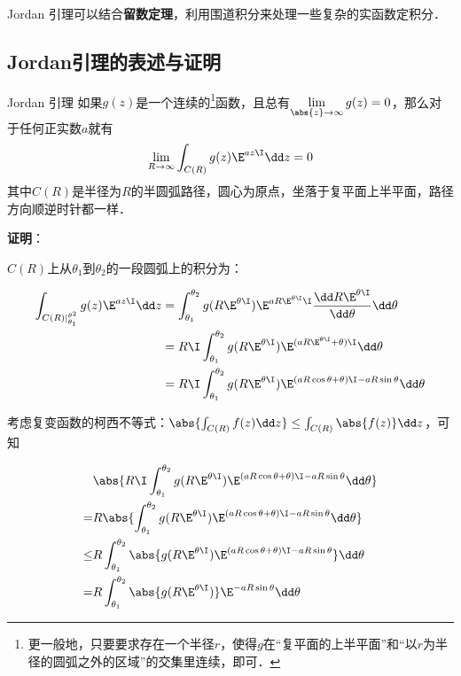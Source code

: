 



Jordan 引理可以结合\textbf{留数定理}，利用围道积分来处理一些复杂的实函数定积分．

\subsection{Jordan引理的表述与证明}

\begin{theorem}{Jordan 引理}
如果$g(z)$是一个连续的\footnote{更一般地，只要要求存在一个半径$r$，使得$g$在“复平面的上半平面”和“以$r$为半径的圆弧之外的区域”的交集里连续，即可．}函数，且总有$\lim\limits_{\abs{z}\to\infty}g(z)=0$，那么对于任何正实数$a$就有
\begin{equation}
\lim\limits_{R\to \infty}\int_{C(R)}g(z)\E^{az\I}\dd z=0
\end{equation}
其中$C(R)$是半径为$R$的半圆弧路径，圆心为原点，坐落于复平面上半平面，路径方向顺逆时针都一样．


\end{theorem}

\textbf{证明}：

$C(R)$上从$\theta_1$到$\theta_2$的一段圆弧上的积分为：

\begin{equation}
\begin{aligned}
\int_{C(R)|_{\theta_1}^{\theta^2}}g(z)\E^{az\I}\dd z&=\int_{\theta_1}^{\theta_2}g( R\E^{\theta\I} )\E^{aR\E^{\theta\I}\I}\frac{\dd R\E^{\theta\I}}{\dd \theta}\dd\theta\\
&=R\I\int_{\theta_1}^{\theta_2}g(R\E^{\theta\I})\E^{(aR\E^{\theta\I}+\theta)\I}\dd\theta\\
&=R\I\int_{\theta_1}^{\theta_2}g(R\E^{\theta\I})\E^{(aR\cos\theta+\theta)\I-aR\sin\theta}\dd\theta
\end{aligned}
\end{equation}

考虑复变函数的柯西不等式：$\abs{\int_{C(R)}f(z)\dd z} \leq \int_{C(R)}\abs{f(z)}\dd z$，可知

\begin{equation}\label{JdLem_eq4}
\begin{aligned}
&\abs{R\I\int_{\theta_1}^{\theta_2}g(R\E^{\theta\I})\E^{(aR\cos\theta+\theta)\I-aR\sin\theta}\dd\theta}\\
=&R\abs{\int_{\theta_1}^{\theta_2}g(R\E^{\theta\I})\E^{(aR\cos\theta+\theta)\I-aR\sin\theta}\dd\theta}\\
\leq&R\int_{\theta_1}^{\theta_2}\abs{g(R\E^{\theta\I})\E^{(aR\cos\theta+\theta)\I-aR\sin\theta}}\dd\theta\\
=&R\int_{\theta_1}^{\theta_2}\abs{g(R\E^{\theta\I})}\E^{-aR\sin\theta}\dd\theta
\end{aligned}
\end{equation}

